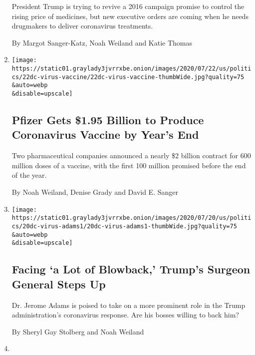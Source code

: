 \begin{enumerate}
  President Trump is trying to revive a 2016 campaign promise to control
  the rising price of medicines, but new executive orders are coming
  when he needs drugmakers to deliver coronavirus treatments.

  By Margot Sanger-Katz, Noah Weiland and Katie Thomas
\item
  \href{/2020/07/22/us/politics/pfizer-coronavirus-vaccine.html}{}

  \texttt{[image: https://static01.graylady3jvrrxbe.onion/images/2020/07/22/us/politics/22dc-virus-vaccine/22dc-virus-vaccine-thumbWide.jpg?quality=75\\\&auto=webp\\\&disable=upscale]}

  \hypertarget{pfizer-gets-195-billion-to-produce-coronavirus-vaccine-by-years-end}{%
  \subsection{Pfizer Gets \$1.95 Billion to Produce Coronavirus Vaccine
  by Year's
  End}\label{pfizer-gets-195-billion-to-produce-coronavirus-vaccine-by-years-end}}

  Two pharmaceutical companies announced a nearly \$2 billion contract
  for 600 million doses of a vaccine, with the first 100 million
  promised before the end of the year.

  By Noah Weiland, Denise Grady and David E. Sanger
\item
  \href{/2020/07/21/us/politics/jerome-adams-surgeon-general-trump-coronavirus.html}{}

  \texttt{[image: https://static01.graylady3jvrrxbe.onion/images/2020/07/20/us/politics/20dc-virus-adams1/20dc-virus-adams1-thumbWide.jpg?quality=75\\\&auto=webp\\\&disable=upscale]}

  \hypertarget{facing-a-lot-of-blowback-trumps-surgeon-general-steps-up}{%
  \subsection{Facing `a Lot of Blowback,' Trump's Surgeon General Steps
  Up}\label{facing-a-lot-of-blowback-trumps-surgeon-general-steps-up}}

  Dr. Jerome Adams is poised to take on a more prominent role in the
  Trump administration's coronavirus response. Are his bosses willing to
  back him?

  By Sheryl Gay Stolberg and Noah Weiland
\item
  \href{/2020/07/18/us/politics/trump-coronavirus-response-failure-leadership.html}{}


\end{enumerate}
